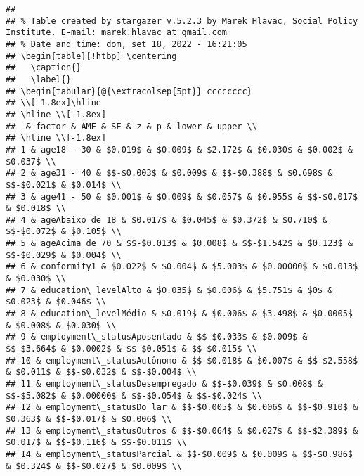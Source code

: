 \documentclass[
]{article}
\begin{document}
\begin{verbatim}
## 
## % Table created by stargazer v.5.2.3 by Marek Hlavac, Social Policy Institute. E-mail: marek.hlavac at gmail.com
## % Date and time: dom, set 18, 2022 - 16:21:05
## \begin{table}[!htbp] \centering 
##   \caption{} 
##   \label{} 
## \begin{tabular}{@{\extracolsep{5pt}} cccccccc} 
## \\[-1.8ex]\hline 
## \hline \\[-1.8ex] 
##  & factor & AME & SE & z & p & lower & upper \\ 
## \hline \\[-1.8ex] 
## 1 & age18 - 30 & $0.019$ & $0.009$ & $2.172$ & $0.030$ & $0.002$ & $0.037$ \\ 
## 2 & age31 - 40 & $$-$0.003$ & $0.009$ & $$-$0.388$ & $0.698$ & $$-$0.021$ & $0.014$ \\ 
## 3 & age41 - 50 & $0.001$ & $0.009$ & $0.057$ & $0.955$ & $$-$0.017$ & $0.018$ \\ 
## 4 & ageAbaixo de 18 & $0.017$ & $0.045$ & $0.372$ & $0.710$ & $$-$0.072$ & $0.105$ \\ 
## 5 & ageAcima de 70 & $$-$0.013$ & $0.008$ & $$-$1.542$ & $0.123$ & $$-$0.029$ & $0.004$ \\ 
## 6 & conformity1 & $0.022$ & $0.004$ & $5.003$ & $0.00000$ & $0.013$ & $0.030$ \\ 
## 7 & education\_levelAlto & $0.035$ & $0.006$ & $5.751$ & $0$ & $0.023$ & $0.046$ \\ 
## 8 & education\_levelMédio & $0.019$ & $0.006$ & $3.498$ & $0.0005$ & $0.008$ & $0.030$ \\ 
## 9 & employment\_statusAposentado & $$-$0.033$ & $0.009$ & $$-$3.664$ & $0.0002$ & $$-$0.051$ & $$-$0.015$ \\ 
## 10 & employment\_statusAutônomo & $$-$0.018$ & $0.007$ & $$-$2.558$ & $0.011$ & $$-$0.032$ & $$-$0.004$ \\ 
## 11 & employment\_statusDesempregado & $$-$0.039$ & $0.008$ & $$-$5.082$ & $0.00000$ & $$-$0.054$ & $$-$0.024$ \\ 
## 12 & employment\_statusDo lar & $$-$0.005$ & $0.006$ & $$-$0.910$ & $0.363$ & $$-$0.017$ & $0.006$ \\ 
## 13 & employment\_statusOutros & $$-$0.064$ & $0.027$ & $$-$2.389$ & $0.017$ & $$-$0.116$ & $$-$0.011$ \\ 
## 14 & employment\_statusParcial & $$-$0.009$ & $0.009$ & $$-$0.986$ & $0.324$ & $$-$0.027$ & $0.009$ \\ 

\end{verbatim}
\end{document}
